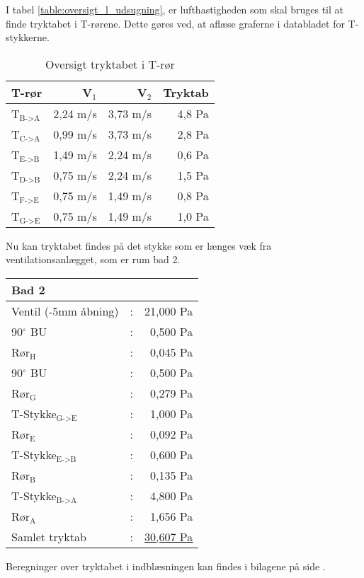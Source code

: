 I tabel \ref{table:oversigt_l_udsugning}, er lufthastigheden som skal bruges til at finde tryktabet i T-rørene.
Dette gøres ved, at aflæse graferne i databladet for T-stykkerne.
\begin{table}[h!]
    \begin{center}
       \begin{tabular}{|l|r|r|r|}
           \hline
           T-rør & V$_{1}$ & V$_{2}$ & Tryktab \\
           \hline
           T$_{\text{B->A}}$ & 2,24 m/s & 3,73 m/s & 4,8 Pa \\ 
           T$_{\text{C->A}}$ & 0,99 m/s & 3,73 m/s & 2,8 Pa \\
           T$_{\text{E->B}}$ & 1,49 m/s & 2,24 m/s & 0,6 Pa \\
           T$_{\text{D->B}}$ & 0,75 m/s & 2,24 m/s & 1,5 Pa \\
           T$_{\text{F->E}}$ & 0,75 m/s & 1,49 m/s & 0,8 Pa \\
           T$_{\text{G->E}}$ & 0,75 m/s & 1,49 m/s & 1,0 Pa \\
           \hline
       \end{tabular}
   \end{center}
   \caption{Oversigt tryktabet i T-rør}
   \label{table:oversigt_tryktab_t-roer}
\end{table}
Nu kan tryktabet findes på det stykke som er længes væk fra ventilationsanlægget, 
som er rum bad 2.
\begin{table}[h!]
    \begin{center}
       \begin{tabular}{lcr}
           \hline
           \hline
           \textbf{Bad 2} &  & \\
           \hline
           \hline
           Ventil (-5mm åbning) & : & 21,000 Pa \\
           90$^\circ$ BU    & : & 0,500 Pa \\
           Rør$_{\text{H}}$ & : & 0,045 Pa \\
           90$^\circ$ BU    & : & 0,500 Pa \\
           Rør$_{\text{G}}$ & : & 0,279 Pa \\
           T-Stykke$_{\text{G->E}}$  & : & 1,000 Pa\\
           Rør$_{\text{E}}$ & : & 0,092 Pa \\
           T-Stykke$_{\text{E->B}}$  & : & 0,600 Pa\\
           Rør$_{\text{B}}$ & : & 0,135 Pa \\
           T-Stykke$_{\text{B->A}}$  & : & 4,800 Pa\\
           Rør$_{\text{A}}$ & : & 1,656 Pa \\
           \hline
           Samlet tryktab    & : & \underline{\underline{ 30,607 Pa}} 
       \end{tabular}
   \end{center}
\end{table}

Beregninger over tryktabet i indblæsningen kan findes i bilagene på side \pageref{sub:tryktab_indblaesning}.
